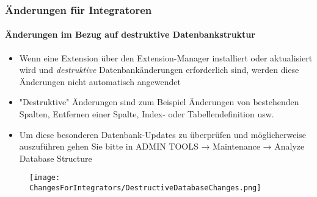 
\begin{frame}[fragile]
	\frametitle{Änderungen für Integratoren}
	\framesubtitle{Änderungen im Bezug auf destruktive Datenbankstruktur}

	\begin{itemize}
		\item Wenn eine Extension über den Extension-Manager installiert oder aktualisiert wird
			und \textit{destruktive} Datenbankänderungen erforderlich sind, werden diese Änderungen
			nicht automatisch angewendet
		\item "Destruktive" Änderungen sind zum Beispiel Änderungen von bestehenden Spalten, 
			Entfernen einer Spalte, Index- oder Tabellendefinition usw.
		\item Um diese besonderen Datenbank-Updates zu überprüfen und möglicherweise auszuführen
			gehen Sie bitte  in ADMIN TOOLS → Maintenance → Analyze Database Structure\newline
	\end{itemize}

	\vspace{-0.4cm}


	\begin{figure}
		\texttt{[image: ChangesForIntegrators/DestructiveDatabaseChanges.png]}
	\end{figure}

\end{frame}


